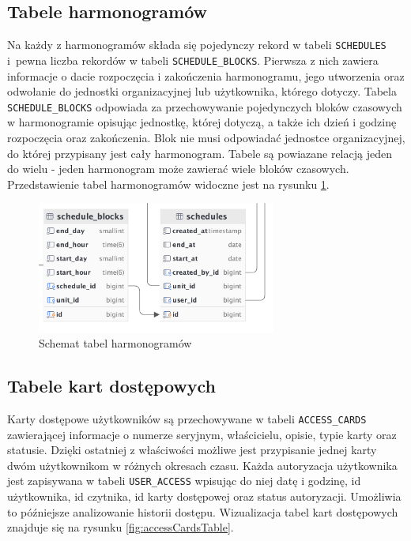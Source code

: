 \subsection{Tabele harmonogramów}
\label{ss:harmonogramy}


Na każdy z harmonogramów składa się pojedynczy rekord w tabeli \texttt{SCHEDULES} i~pewna liczba rekordów w tabeli \texttt{SCHEDULE\_BLOCKS}. Pierwsza z nich zawiera informacje o dacie rozpoczęcia i zakończenia harmonogramu, jego utworzenia oraz odwołanie do jednostki organizacyjnej lub użytkownika, którego dotyczy. Tabela \texttt{SCHEDULE\_BLOCKS} odpowiada za przechowywanie pojedynczych bloków czasowych w harmonogramie opisując jednostkę, której dotyczą, a także ich dzień i godzinę rozpoczęcia oraz zakończenia. Blok nie musi odpowiadać jednostce organizacyjnej, do której przypisany jest cały harmonogram. Tabele są powiazane relacją jeden do wielu - jeden harmonogram może zawierać wiele bloków czasowych. Przedstawienie tabel harmonogramów widoczne jest na rysunku \ref{fig:schedulesTable}.

\begin{figure}[H]
    \centering
    \includegraphics[width=0.7\textwidth]{graf/scheduleTable.png}
    \caption{Schemat tabel harmonogramów}
    \label{fig:schedulesTable}
\end{figure}

\subsection{Tabele kart dostępowych}

Karty dostępowe użytkowników są przechowywane w tabeli \texttt{ACCESS\_CARDS} zawierającej informacje o numerze seryjnym, właścicielu, opisie, typie karty oraz statusie. Dzięki ostatniej z właściwości możliwe jest przypisanie jednej karty dwóm użytkownikom w różnych okresach czasu. Każda autoryzacja użytkownika jest zapisywana w tabeli \texttt{USER\_ACCESS} wpisując do niej datę i godzinę, id użytkownika, id czytnika, id karty dostępowej oraz status autoryzacji. Umożliwia to późniejsze analizowanie historii dostępu. Wizualizacja tabel kart dostępowych znajduje się na rysunku \ref{fig:accessCardsTable}.


